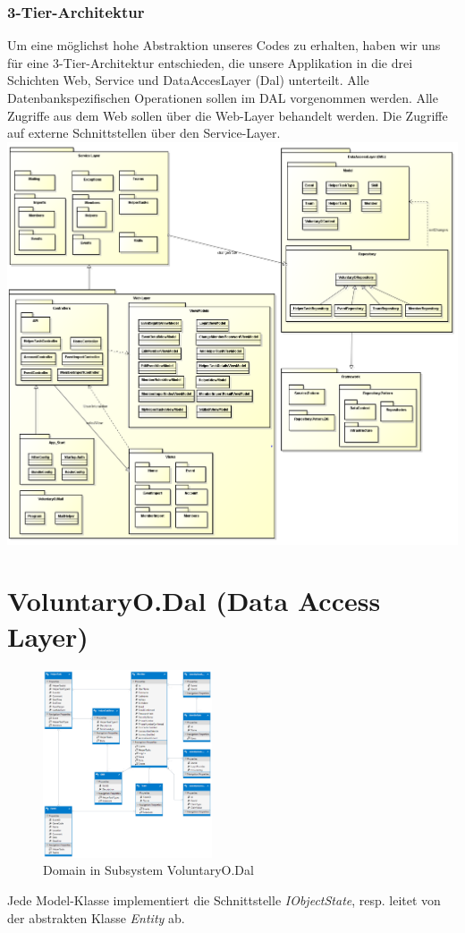 		\subsubsection{3-Tier-Architektur}
		Um eine möglichst hohe Abstraktion unseres Codes zu erhalten, haben wir uns für eine 3-Tier-Architektur entschieden, die unsere Applikation in die drei Schichten Web, Service und DataAccesLayer (Dal) unterteilt. Alle Datenbankspezifischen Operationen sollen im DAL vorgenommen werden. Alle Zugriffe aus dem Web sollen über die Web-Layer behandelt werden. Die Zugriffe auf externe Schnittstellen über den Service-Layer.
		\includegraphics[width=\textwidth]{content/architekturdokumentation/images/LogischeArchitektur.png}

\section{VoluntaryO.Dal (Data Access Layer)}
    \begin{figure}[h]
  		\vspace{-5pt}
    	\centering
    	\includegraphics[width=5cm]{content/architekturdokumentation/images/edmx.png}
  		\vspace{-25pt}
    	\caption{Domain in Subsystem VoluntaryO.Dal}
	\end{figure}
	Jede Model-Klasse implementiert die Schnittstelle \textit{IObjectState}, resp. leitet von der abstrakten Klasse \textit{Entity} ab.

